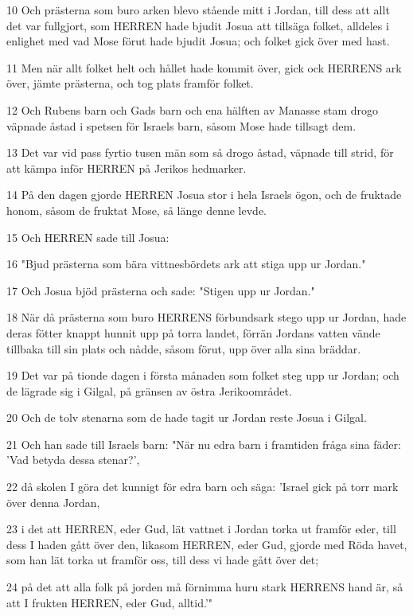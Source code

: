 \par 10 Och prästerna som buro arken blevo stående mitt i Jordan, till dess att allt det var fullgjort, som HERREN hade bjudit Josua att tillsäga folket, alldeles i enlighet med vad Mose förut hade bjudit Josua; och folket gick över med hast.
\par 11 Men när allt folket helt och hållet hade kommit över, gick ock HERRENS ark över, jämte prästerna, och tog plats framför folket.
\par 12 Och Rubens barn och Gads barn och ena hälften av Manasse stam drogo väpnade åstad i spetsen för Israels barn, såsom Mose hade tillsagt dem.
\par 13 Det var vid pass fyrtio tusen män som så drogo åstad, väpnade till strid, för att kämpa inför HERREN på Jerikos hedmarker.
\par 14 På den dagen gjorde HERREN Josua stor i hela Israels ögon, och de fruktade honom, såsom de fruktat Mose, så länge denne levde.
\par 15 Och HERREN sade till Josua:
\par 16 "Bjud prästerna som bära vittnesbördets ark att stiga upp ur Jordan."
\par 17 Och Josua bjöd prästerna och sade: "Stigen upp ur Jordan."
\par 18 När då prästerna som buro HERRENS förbundsark stego upp ur Jordan, hade deras fötter knappt hunnit upp på torra landet, förrän Jordans vatten vände tillbaka till sin plats och nådde, såsom förut, upp över alla sina bräddar.
\par 19 Det var på tionde dagen i första månaden som folket steg upp ur Jordan; och de lägrade sig i Gilgal, på gränsen av östra Jerikoområdet.
\par 20 Och de tolv stenarna som de hade tagit ur Jordan reste Josua i Gilgal.
\par 21 Och han sade till Israels barn: "När nu edra barn i framtiden fråga sina fäder: 'Vad betyda dessa stenar?',
\par 22 då skolen I göra det kunnigt för edra barn och säga: 'Israel gick på torr mark över denna Jordan,
\par 23 i det att HERREN, eder Gud, lät vattnet i Jordan torka ut framför eder, till dess I haden gått över den, likasom HERREN, eder Gud, gjorde med Röda havet, som han lät torka ut framför oss, till dess vi hade gått över det;
\par 24 på det att alla folk på jorden må förnimma huru stark HERRENS hand är, så att I frukten HERREN, eder Gud, alltid.'"

